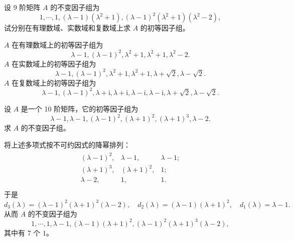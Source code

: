 \documentclass[../../main.tex]{subfiles}
\begin{document}
\begin{example}
设 9 阶矩阵 $A$ 的不变因子组为
\[
1,\cdots,1,(\lambda - 1)(\lambda^2 + 1),(\lambda - 1)^2(\lambda^2 + 1)(\lambda^2 - 2),
\]
试分别在有理数域、实数域和复数域上求 $A$ 的初等因子组。
\end{example}
\begin{solution}
$A$ 在有理数域上的初等因子组为
\[
\lambda - 1,(\lambda - 1)^2,\lambda^2 + 1,\lambda^2 + 1,\lambda^2 - 2.
\]
$A$ 在实数域上的初等因子组为
\[
\lambda - 1,(\lambda - 1)^2,\lambda^2 + 1,\lambda^2 + 1,\lambda + \sqrt{2},\lambda - \sqrt{2}.
\]
$A$ 在复数域上的初等因子组为
\[
\lambda - 1,(\lambda - 1)^2,\lambda + \mathrm{i},\lambda + \mathrm{i},\lambda - \mathrm{i},\lambda - \mathrm{i},\lambda + \sqrt{2},\lambda - \sqrt{2}.
\]
\end{solution}

\begin{example}
设 $A$ 是一个 10 阶矩阵，它的初等因子组为
\[
\lambda - 1,\lambda - 1,(\lambda - 1)^2,(\lambda + 1)^2,(\lambda + 1)^3,\lambda - 2.
\]
求 $A$ 的不变因子组。
\end{example}
\begin{solution}
将上述多项式按不可约因式的降幂排列：
\begin{align*}
\begin{matrix}
(\lambda -1)^2,&		\lambda -1,&		\lambda -1;\\
(\lambda +1)^3,&		(\lambda +1)^2,&		1;\\
\lambda -2,&		1,&		1.\\
\end{matrix}
\end{align*}
于是
\[
d_3(\lambda)=(\lambda - 1)^2(\lambda + 1)^3(\lambda - 2),\quad d_2(\lambda)=(\lambda - 1)(\lambda + 1)^2,\quad d_1(\lambda)=\lambda - 1.
\]
从而 $A$ 的不变因子组为
\[
1,\cdots,1,\lambda - 1,(\lambda - 1)(\lambda + 1)^2,(\lambda - 1)^2(\lambda + 1)^3(\lambda - 2),
\]
其中有 7 个 $1$。 
\end{solution}
\end{document}
